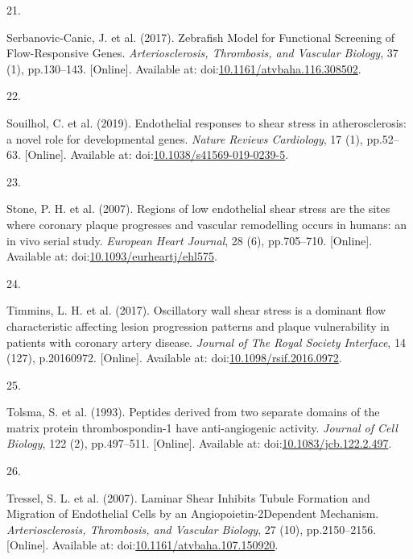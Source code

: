 \documentclass[
  11pt,
]{article}
\newlength{\cslhangindent}
\newlength{\csllabelwidth}
\newlength{\cslentryspacingunit} %
\newenvironment{CSLReferences}[2] %
 {%
  \setlength{\parindent}{0pt}
  \ifodd #1
  \let\oldpar\par
  \def\par{\hangindent=\cslhangindent\oldpar}
  \fi
  \setlength{\parskip}{#2\cslentryspacingunit}
 }%
 {}
\newcommand{\CSLLeftMargin}[1]{\parbox[t]{\csllabelwidth}{#1}}
\newcommand{\CSLRightInline}[1]{\parbox[t]{\linewidth - \csllabelwidth}{#1}\break}
\begin{document}
\begin{CSLReferences}{0}{0}
\leavevmode{}%
\CSLLeftMargin{21. }
\CSLRightInline{Serbanovic-Canic, J. {et al.} (2017). {Zebrafish Model for Functional Screening of Flow-Responsive Genes}. \emph{Arteriosclerosis, Thrombosis, and Vascular Biology}, 37 (1), pp.130--143. {[}Online{]}. Available at: doi:\href{https://doi.org/10.1161/atvbaha.116.308502}{10.1161/atvbaha.116.308502}.}

\leavevmode{}%
\CSLLeftMargin{22. }
\CSLRightInline{Souilhol, C. {et al.} (2019). {Endothelial responses to shear stress in atherosclerosis: a novel role for developmental genes}. \emph{Nature Reviews Cardiology}, 17 (1), pp.52--63. {[}Online{]}. Available at: doi:\href{https://doi.org/10.1038/s41569-019-0239-5}{10.1038/s41569-019-0239-5}.}

\leavevmode{}%
\CSLLeftMargin{23. }
\CSLRightInline{Stone, P. H. {et al.} (2007). {Regions of low endothelial shear stress are the sites where coronary plaque progresses and vascular remodelling occurs in humans: an in vivo serial study}. \emph{European Heart Journal}, 28 (6), pp.705--710. {[}Online{]}. Available at: doi:\href{https://doi.org/10.1093/eurheartj/ehl575}{10.1093/eurheartj/ehl575}.}

\leavevmode{}%
\CSLLeftMargin{24. }
\CSLRightInline{Timmins, L. H. {et al.} (2017). {Oscillatory wall shear stress is a dominant flow characteristic affecting lesion progression patterns and plaque vulnerability in patients with coronary artery disease}. \emph{Journal of The Royal Society Interface}, 14 (127), p.20160972. {[}Online{]}. Available at: doi:\href{https://doi.org/10.1098/rsif.2016.0972}{10.1098/rsif.2016.0972}.}

\leavevmode{}%
\CSLLeftMargin{25. }
\CSLRightInline{Tolsma, S. {et al.} (1993). {Peptides derived from two separate domains of the matrix protein thrombospondin-1 have anti-angiogenic activity}. \emph{Journal of Cell Biology}, 122 (2), pp.497--511. {[}Online{]}. Available at: doi:\href{https://doi.org/10.1083/jcb.122.2.497}{10.1083/jcb.122.2.497}.}

\leavevmode{}%
\CSLLeftMargin{26. }
\CSLRightInline{Tressel, S. L. {et al.} (2007). {Laminar Shear Inhibits Tubule Formation and Migration of Endothelial Cells by an Angiopoietin-2{\textendash}Dependent Mechanism}. \emph{Arteriosclerosis, Thrombosis, and Vascular Biology}, 27 (10), pp.2150--2156. {[}Online{]}. Available at: doi:\href{https://doi.org/10.1161/atvbaha.107.150920}{10.1161/atvbaha.107.150920}.}


\end{CSLReferences}
\end{document}
